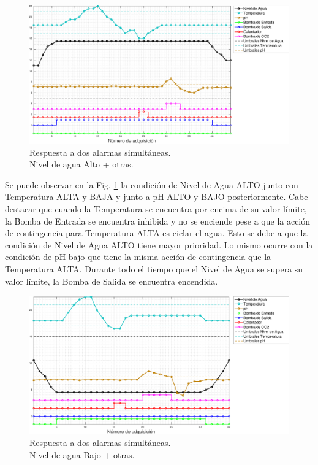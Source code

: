 \begin{figure}[h]
\centering
    \includegraphics[width=\textwidth]{./Figures/plot2waterHigh.pdf}
	\caption{Respuesta a dos alarmas simultáneas.\\ Nivel de agua Alto + otras.}
	\label{fig:alarma2WaterHigh}
\end{figure}

Se puede observar en la Fig. \ref{fig:alarma2WaterHigh} la condición de Nivel de Agua ALTO junto con Temperatura ALTA y BAJA y junto a pH ALTO y BAJO posteriormente.  Cabe destacar que cuando la Temperatura se encuentra por encima de su valor límite, la Bomba de Entrada se encuentra inhibida y no se enciende pese a que la acción de contingencia para Temperatura ALTA es ciclar el agua.  Esto se debe a que la condición de Nivel de Agua ALTO tiene mayor prioridad.  Lo mismo ocurre con la condición de pH bajo que tiene la misma acción de contingencia que la Temperatura ALTA.  Durante todo el tiempo que el Nivel de Agua se supera su valor límite, la Bomba de Salida se encuentra encendida.

\begin{figure}
\centering
    \includegraphics[width=\textwidth]{./Figures/plot2waterLow.pdf}
	\caption{Respuesta a dos alarmas simultáneas.\\ Nivel de agua Bajo + otras.}
	\label{fig:alarma2WaterLow}
\end{figure}

